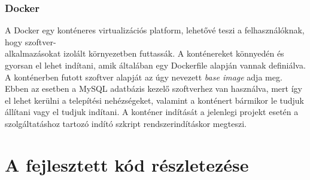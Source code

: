\documentclass[11pt, a4paper]{article}
\begin{document}
		\subsubsection{Docker}
			\begin{flushleft}
				\justifying
				A Docker egy konténeres virtualizációs platform, lehetővé teszi a felhasználóknak, hogy szoftver-\\alkalmazásokat izolált környezetben futtassák. A konténereket könnyedén és gyorsan el lehet indítani, amik általában egy Dockerfile alapján vannak definiálva. A konténerben futott szoftver alapját az úgy nevezett \emph{base image} adja meg. Ebben az esetben a MySQL adatbázis kezelő szoftverhez van használva, mert így el lehet kerülni a telepítési nehézségeket, valamint a konténert bármikor le tudjuk állítani vagy el tudjuk indítani. A konténer indítását a jelenlegi projekt esetén a szolgáltatáshoz tartozó indító szkript rendszerindításkor megteszi.
			\end{flushleft}

	\section{A fejlesztett kód részletezése}
\end{document}
